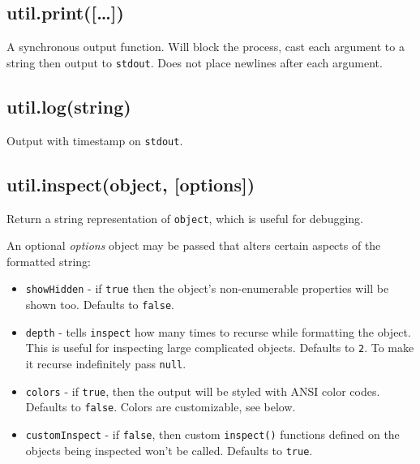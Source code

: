 \subsection{util.print({[}\ldots{}{]})}

A synchronous output function. Will block the process, cast each
argument to a string then output to \texttt{stdout}. Does not place
newlines after each argument.

\subsection{util.log(string)}

Output with timestamp on \texttt{stdout}.

\begin{Shaded}
\begin{Highlighting}[]
\NormalTok{(}\NormalTok{);}
\end{Highlighting}
\end{Shaded}

\subsection{util.inspect(object, {[}options{]})}

Return a string representation of \texttt{object}, which is useful for
debugging.

An optional \emph{options} object may be passed that alters certain
aspects of the formatted string:

\begin{itemize}
\item
  \texttt{showHidden} - if \texttt{true} then the object's
  non-enumerable properties will be shown too. Defaults to
  \texttt{false}.
\item
  \texttt{depth} - tells \texttt{inspect} how many times to recurse
  while formatting the object. This is useful for inspecting large
  complicated objects. Defaults to \texttt{2}. To make it recurse
  indefinitely pass \texttt{null}.
\item
  \texttt{colors} - if \texttt{true}, then the output will be styled
  with ANSI color codes. Defaults to \texttt{false}. Colors are
  customizable, see below.
\item
  \texttt{customInspect} - if \texttt{false}, then custom
  \texttt{inspect()} functions defined on the objects being inspected
  won't be called. Defaults to \texttt{true}.
\end{itemize}

